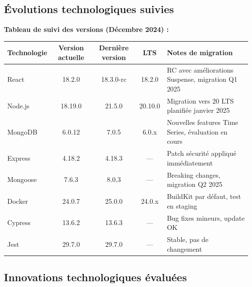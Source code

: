 \subsection{Évolutions technologiques suivies}

\begin{exemple}
\textbf{Tableau de suivi des versions (Décembre 2024) :}
\begin{center}
\begin{tabular}{|l|c|c|c|p{5cm}|}
\hline
\textbf{Technologie} & \textbf{Version actuelle} & \textbf{Dernière version} & \textbf{LTS} & \textbf{Notes de migration} \\
\hline
React & 18.2.0 & 18.3.0-rc & 18.2.0 & RC avec améliorations Suspense, migration Q1 2025 \\
\hline
Node.js & 18.19.0 & 21.5.0 & 20.10.0 & Migration vers 20 LTS planifiée janvier 2025 \\
\hline
MongoDB & 6.0.12 & 7.0.5 & 6.0.x & Nouvelles features Time Series, évaluation en cours \\
\hline
Express & 4.18.2 & 4.18.3 & --- & Patch sécurité appliqué immédiatement \\
\hline
Mongoose & 7.6.3 & 8.0.3 & --- & Breaking changes, migration Q2 2025 \\
\hline
Docker & 24.0.7 & 25.0.0 & 24.0.x & BuildKit par défaut, test en staging \\
\hline
Cypress & 13.6.2 & 13.6.3 & --- & Bug fixes mineurs, update OK \\
\hline
Jest & 29.7.0 & 29.7.0 & --- & Stable, pas de changement \\
\hline
\end{tabular}
\end{center}
\end{exemple}

\subsection{Innovations technologiques évaluées}

